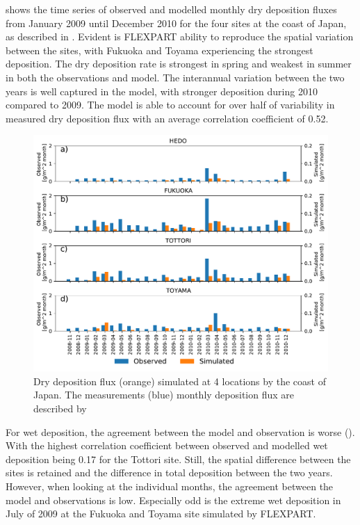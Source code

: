  shows the time series of observed and modelled monthly dry deposition fluxes from January 2009 until December 2010 for the four sites at the coast of Japan, as described in . 
Evident is FLEXPART ability to reproduce the spatial variation between the sites, with Fukuoka and Toyama experiencing the strongest deposition.
The dry deposition rate is strongest in spring and weakest in summer in both the observations and model. 
The interannual variation between the two years is well captured in the model, with stronger deposition during 2010 compared to 2009. 
The model is able to account for over half of variability in measured dry deposition flux with an average correlation coefficient of 0.52.
\begin{figure}[hptb]
    \centering
    \includegraphics[width=\textwidth]{texfiles/figs/monthly_accumulated_dry_depostion_japan.pdf}
    \caption{Dry deposition flux (orange) simulated at 4 locations by the coast of Japan. The measurements (blue) monthly deposition flux are described by \textcite{osada2014wet}}
    \label{fig:model_eval_dry_deposition}
\end{figure}

For wet deposition, the agreement between the model and observation is worse (). 
With the highest correlation coefficient between observed and modelled wet deposition  being 0.17 for the Tottori site.  
Still, the spatial difference between the sites is retained and the difference in total deposition between the two years. 
However, when looking at the individual months, the agreement between the model and observations is low. 
Especially odd is the extreme wet deposition in July of 2009 at the Fukuoka and Toyama site simulated by FLEXPART. 

